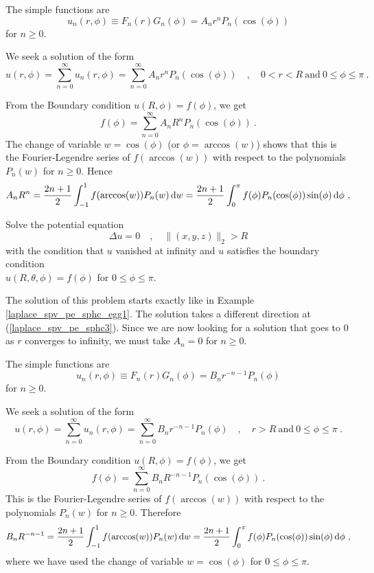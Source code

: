 \begin{egg}
The simple functions are
\[
u_n(r,\phi) \equiv F_n(r)G_n(\phi) = A_n r^n P_n(\cos(\phi))
\]
for $n \geq 0$.

We seek a solution of the form
\[
u(r,\phi) = \sum_{n=0}^\infty u_n(r,\phi)
= \sum_{n=0}^\infty A_n r^n P_n(\cos(\phi))
\quad , \quad 0 < r < R \ \text{and} \ 0 \leq \phi \leq \pi \ .
\]

From the Boundary condition $u(R,\phi) = f(\phi)$, we get
\[
f(\phi) = \sum_{n=0}^\infty A_n R^n P_n(\cos(\phi)) \ .
\]
The change of variable $w=\cos(\phi)$ (or $\phi= \arccos(w)$) shows
that this is the Fourier-Legendre series of $f(\arccos(w))$ with
respect to the polynomials $P_n(w)$ for $n \geq 0$.
Hence
\[
A_n R^n = \frac{2n+1}{2} \int_{-1}^1 f(\arccos(w)) P_n(w) \,\mathrm{d}{w}
= \frac{2n+1}{2} \int_0^\pi f(\phi) P_n(\cos(\phi)) \sin(\phi) \,\mathrm{d}{\phi} \ ,
\]
\end{egg}

\begin{egg}
Solve the potential equation
\[
\Delta u = 0 \quad , \quad \|(x,y,z)\|_2 > R
\]
with the condition that $u$ vanished at infinity and $u$ satisfies the
boundary condition\\
$u(R,\theta, \phi) = f(\phi)$ for $0 \leq \phi \leq \pi$.

The solution of this problem starts exactly like in Example
\ref{laplace_spv_pe_sphc_egg1}.  The solution 
takes a different direction at (\ref{laplace_spv_pe_sphc3}).  Since we
are now looking for a solution that goes to $0$ as $r$ converges to
infinity, we must take $A_n =0$ for $n \geq 0$.

The simple functions are
\[
u_n(r,\phi) \equiv F_n(r)G_n(\phi) = B_n r^{-n-1} P_n(\phi)
\]
for $n \geq 0$.

We seek a solution of the form
\[
u(r,\phi) = \sum_{n=0}^\infty u_n(r,\phi)
= \sum_{n=0}^\infty B_n r^{-n-1} P_n(\phi)
\quad , \quad r > R \ \text{and} \ 0 \leq \phi \leq \pi \ .
\]

From the Boundary condition $u(R,\phi) = f(\phi)$, we get
\[
f(\phi) = \sum_{n=0}^\infty B_n R^{-n-1} P_n(\cos(\phi)) \ .
\]
This is the Fourier-Legendre series of $f(\arccos(w))$ with respect to
the polynomials $P_n(w)$ for $n \geq 0$.
Therefore
\[
B_n R^{-n-1} = \frac{2n+1}{2} \int_{-1}^1 f(\arccos(w)) P_n(w) \,\mathrm{d}{w}
= \frac{2n+1}{2} \int_0^\pi f(\phi) P_n(\cos(\phi)) \sin(\phi) \,\mathrm{d}{\phi} \ ,
\]
where we have used the change of variable $w=\cos(\phi)$ for
$0\leq \phi \leq \pi$.
\end{egg}

